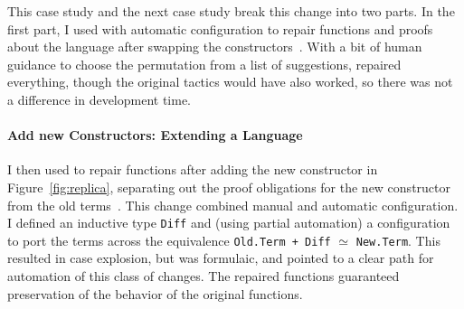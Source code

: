 This case study and the next case study break this change into two parts.
In the first part, I used \toolnamec with automatic configuration to repair functions and proofs about the language
after swapping the constructors~\href{https://github.com/uwplse/pumpkin-pi/blob/v2.0.0/plugin/coq/Swap.v}{}.
With a bit of human guidance to choose the permutation from a list of suggestions,
\toolnamec repaired everything,
though the original tactics would have also worked,
so there was not a difference in development time.

\paragraph{Add new Constructors: Extending a Language}
I then used \toolnamec to repair functions 
after adding the new constructor in Figure~\ref{fig:replica}, separating out the proof obligations for the new constructor from the old terms~\href{https://github.com/uwplse/pumpkin-pi/blob/v2.0.0/plugin/coq/playground/add_constr.v}{}.
This change combined manual and automatic configuration.
I defined an inductive type \lstinline{Diff} and (using partial automation) a configuration to port the terms across the equivalence \lstinline{Old.Term + Diff} $\simeq$ \lstinline{New.Term}.
This resulted in case explosion, but was formulaic, and pointed to a clear path for automation of this class of changes.
The repaired functions guaranteed preservation of the behavior of the original functions. %

